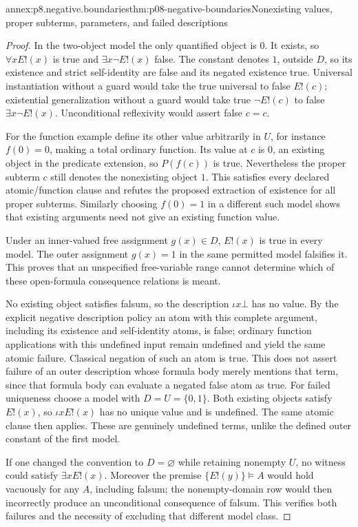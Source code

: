 \begin{annexitem}{annex:p8.negative.boundaries}{thm:p08-negative-boundaries}{Nonexisting values, proper subterms, parameters, and failed descriptions}
\begin{proof}
In the two-object model the only quantified object is \(0\).
It exists, so \(\forall xE!(x)\) is true and
\(\exists x\neg E!(x)\) false.  The constant denotes \(1\),
outside \(D\), so its existence and strict self-identity are
false and its negated existence true.  Universal instantiation
without a guard would take the true universal to false \(E!(c)\);
existential generalization without a guard would take true
\(\neg E!(c)\) to false \(\exists x\neg E!(x)\).
Unconditional reflexivity would assert false \(c=c\).

For the function example define its other value arbitrarily in
\(U\), for instance \(f(0)=0\), making a total ordinary function.
Its value at \(c\) is \(0\), an existing object in the predicate
extension, so \(P(f(c))\) is true.  Nevertheless the proper
subterm \(c\) still denotes the nonexisting object \(1\).
This satisfies every declared atomic/function clause and refutes
the proposed extraction of existence for all proper subterms.
Similarly choosing \(f(0)=1\) in a different such model shows
that existing arguments need not give an existing function value.

Under an inner-valued free assignment \(g(x)\in D\),
\(E!(x)\) is true in every model.  The outer assignment
\(g(x)=1\) in the same permitted model falsifies it.
This proves that an unspecified free-variable range cannot
determine which of these open-formula consequence relations is meant.

No existing object satisfies falsum, so the description
\(\iota x\bot\) has no value.  By the explicit negative
description policy an atom with this complete argument, including its
existence and self-identity atoms, is false; ordinary function applications
with this undefined input remain undefined and yield the same atomic
failure. Classical negation of such an atom is true. This does not assert
failure of an outer description whose formula body merely mentions that
term, since that formula body can evaluate a negated false atom as true.
For failed uniqueness choose a model with \(D=U=\{0,1\}\).
Both existing objects satisfy \(E!(x)\), so
\(\iota xE!(x)\) has no unique value and is undefined.
The same atomic clause then applies.  These are genuinely
undefined terms, unlike the defined outer constant of the first model.

If one changed the convention to \(D=\varnothing\) while
retaining nonempty \(U\), no witness could satisfy
\(\exists xE!(x)\).  Moreover the premise
\(\{E!(y)\}\models A\) would hold vacuously for any \(A\),
including falsum; the nonempty-domain row would then incorrectly
produce an unconditional consequence of falsum.  This verifies
both failures and the necessity of excluding that different model class.
\end{proof}
\end{annexitem}

